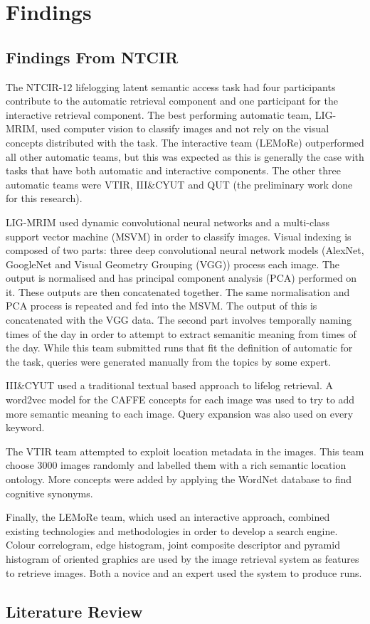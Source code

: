 \chapter{Findings}

\section{Findings From NTCIR}
The NTCIR-12 lifelogging latent semantic access task had four participants contribute to the automatic retrieval component and one participant for the interactive retrieval component. The best performing automatic team, LIG-MRIM, used computer vision to classify images and not rely on the visual concepts distributed with the task. The interactive team (LEMoRe) outperformed all other automatic teams, but this was expected as this is generally the case with tasks that have both automatic and interactive components. The other three automatic teams were VTIR, III\&CYUT and QUT (the preliminary work done for this research).

LIG-MRIM used dynamic convolutional neural networks and a multi-class support vector machine (MSVM) in order to classify images. Visual indexing is composed of two parts: three deep convolutional neural network models (AlexNet, GoogleNet and Visual Geometry Grouping (VGG)) process each image. The output is normalised and has principal component analysis (PCA) performed on it. These outputs are then concatenated together. The same normalisation and PCA process is repeated and fed into the MSVM. The output of this is concatenated with the VGG data. The second part involves temporally naming times of the day in order to attempt to extract semanitic meaning from times of the day. While this team submitted runs that fit the definition of automatic for the task, queries were generated manually from the topics by some expert.

III\&CYUT used a traditional textual based approach to lifelog retrieval. A word2vec model for the CAFFE concepts for each image was used to try to add more semantic meaning to each image. Query expansion was also used on every keyword.

The VTIR team attempted to exploit location metadata in the images. This team choose 3000 images randomly and labelled them with a rich semantic location ontology. More concepts were added by applying the WordNet database to find cognitive synonyms.

Finally, the LEMoRe team, which used an interactive approach, combined existing technologies and methodologies in order to develop a search engine. Colour correlogram, edge histogram, joint composite descriptor and pyramid histogram of oriented graphics are used by the image retrieval system as features to retrieve images. Both a novice and an expert used the system to produce runs.
\section{Literature Review}


